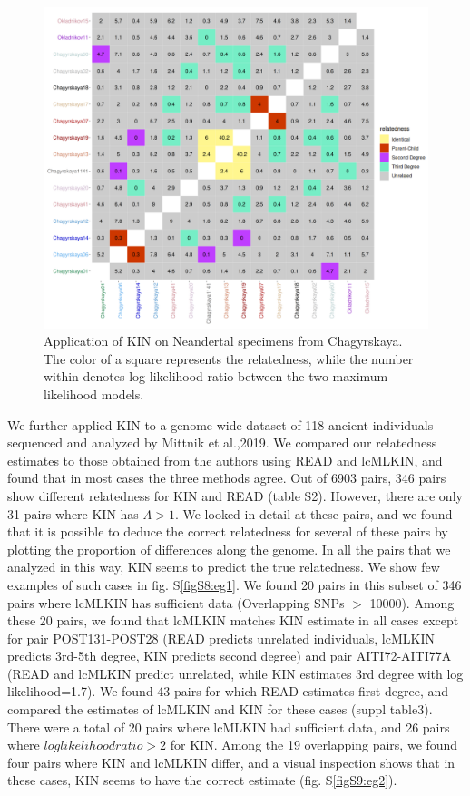 \documentclass[12pt, letterpaper]{article}
\begin{document}
\begin{figure}[h!]
    \includegraphics[width=18cm]{plots/inkscape_finalImg/kinplot.png}
    \centering
    \caption{Application of KIN on Neandertal specimens from Chagyrskaya. The color of a square represents the relatedness, while the number within denotes log likelihood ratio between the two maximum likelihood models.}
    \label{fig5:Chagyrskaya_KIN}
\end{figure}

We further applied KIN to a genome-wide dataset of 118 ancient individuals sequenced and analyzed by Mittnik et al.,2019. We compared our relatedness estimates to those obtained from the authors using READ and lcMLKIN, and found that in most cases the three methods agree. Out of 6903 pairs, 346 pairs show different relatedness for KIN and READ (table S2). However, there are only 31 pairs where KIN has $\Lambda >1$. We looked in detail at these pairs, and we found that it is possible to deduce the correct relatedness for several of these pairs by plotting the proportion of differences along the genome. In all the pairs that we analyzed in this way, KIN seems to predict the true relatedness. We show few examples of such cases in fig. S\ref{figS8:eg1}. We found 20 pairs in this subset of 346 pairs where lcMLKIN has sufficient data (Overlapping SNPs $>$ 10000). Among these 20 pairs, we found that lcMLKIN matches KIN estimate in all cases except for pair POST131-POST28 (READ predicts unrelated individuals, lcMLKIN predicts 3rd-5th degree, KIN predicts second degree) and pair AITI72-AITI77A (READ and lcMLKIN predict unrelated, while KIN estimates 3rd degree with log likelihood=1.7).  
We found 43 pairs for which READ estimates first degree, and compared the estimates of lcMLKIN and KIN for these cases (suppl table3). There were a total of 20 pairs where lcMLKIN had sufficient data, and 26 pairs where $loglikelihood ratio>2$ for KIN. Among the 19 overlapping pairs, we found four pairs where KIN and lcMLKIN differ, and a visual inspection shows that in these cases, KIN seems to have the correct estimate (fig. S\ref{figS9:eg2}).  
\end{document}

